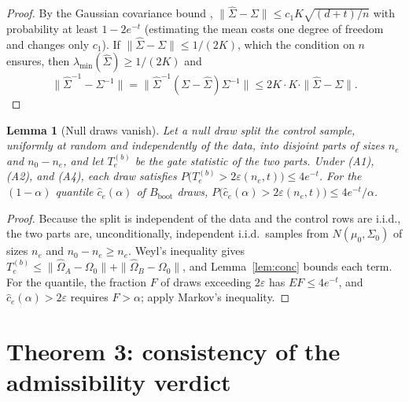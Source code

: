 \documentclass[11pt]{article}
\newtheorem{lemma}{Lemma}
\theoremstyle{remark}
\newcommand{\Bb}{B_{\mathrm{boot}}}
\begin{document}
\begin{proof}
By the Gaussian covariance bound \citep[Thm.~5.39, Rem.~5.40]{vershynin2012nonasymptotic}, $\|\widehat\Sigma-\Sigma\|\le c_1K\sqrt{(d+t)/n}$ with probability at least $1-2e^{-t}$ (estimating the mean costs one degree of freedom and changes only $c_1$). If $\|\widehat\Sigma-\Sigma\|\le 1/(2K)$, which the condition on $n$ ensures, then $\lambda_{\min}(\widehat\Sigma)\ge 1/(2K)$ and
\[\|\widehat\Sigma^{-1}-\Sigma^{-1}\|=\|\widehat\Sigma^{-1}(\Sigma-\widehat\Sigma)\Sigma^{-1}\|\le 2K\cdot K\cdot\|\widehat\Sigma-\Sigma\|.\]
\end{proof}

\begin{lemma}[Null draws vanish]
\label{lem:null}
Let a null draw split the control sample, uniformly at random and independently of the data, into disjoint parts of sizes $n_e$ and $n_0-n_e$, and let $T^{(b)}_e$ be the gate statistic of the two parts. Under (A1), (A2), and (A4), each draw satisfies $P\bigl(T^{(b)}_e>2\varepsilon(n_e,t)\bigr)\le 4e^{-t}$. For the $(1-\alpha)$ quantile $\widehat c_e(\alpha)$ of $\Bb$ draws, $P\bigl(\widehat c_e(\alpha)>2\varepsilon(n_e,t)\bigr)\le 4e^{-t}/\alpha$.
\end{lemma}

\begin{proof}
Because the split is independent of the data and the control rows are i.i.d., the two parts are, unconditionally, independent i.i.d.\ samples from $N(\mu_0,\Sigma_0)$ of sizes $n_e$ and $n_0-n_e\ge n_e$. Weyl's inequality gives $T^{(b)}_e\le\|\widehat\Omega_A-\Omega_0\|+\|\widehat\Omega_B-\Omega_0\|$, and Lemma~\ref{lem:conc} bounds each term. For the quantile, the fraction $F$ of draws exceeding $2\varepsilon$ has $E F\le 4e^{-t}$, and $\widehat c_e(\alpha)>2\varepsilon$ requires $F>\alpha$; apply Markov's inequality.
\end{proof}

\section{Theorem 3: consistency of the admissibility verdict}
\end{document}
